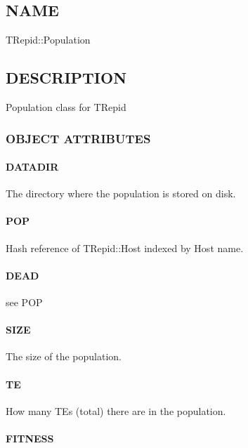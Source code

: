 \subsection{NAME\label{NAME}}


TRepid::Population

\subsection{DESCRIPTION\label{DESCRIPTION}}


Population class for TRepid

\subsubsection*{OBJECT ATTRIBUTES\label{OBJECT_ATTRIBUTES}}
\paragraph*{DATADIR\label{DATADIR}}


The directory where the population is stored on disk.

\paragraph*{POP\label{POP}}


Hash reference of TRepid::Host indexed by Host name.

\paragraph*{DEAD\label{DEAD}}


see POP

\paragraph*{SIZE\label{SIZE}}


The size of the population.

\paragraph*{TE\label{TE}}


How many TEs (total) there are in the population.

\paragraph*{FITNESS\label{FITNESS}}


